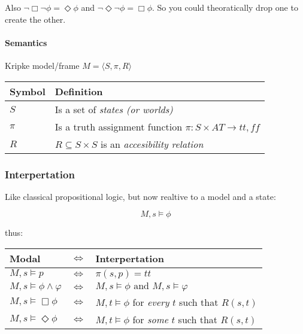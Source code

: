 \documentclass{article}
\begin{document}
\noindent
Also $\neg\Box\neg\phi = \Diamond\phi$ and
$\neg\Diamond\neg\phi = \Box\phi$. So you could theoratically
drop one to create the other.

\paragraph{Semantics} Kripke %
model/frame $M=\langle S,\pi,R \rangle$

\begin{tabular}{ll}
	Symbol & Definition \\ \toprule
	$S$ & Is a set of \emph{states (or worlds)} \\
	$\pi$ & Is a truth assignment function $\pi : S \times AT \to {tt, ff}$ \\
	$R$	& $R \subseteq S \times S$ is an \emph{accesibility relation}\\
\end{tabular}

\subsubsection{Interpertation}

\begin{center}
\end{center}

Like classical propositional logic, but now realtive to a model and a state:

\[ M,s \vDash \phi \]

thus:

\begin{tabular}{lll}
	Modal & $\Leftrightarrow$ & Interpertation \\ \toprule
$M,s \vDash p$ & $\Leftrightarrow$ & $\pi(s,p) = tt$ \\
$M,s \vDash \phi \wedge \varphi $ & $\Leftrightarrow$ & $ M,s \vDash \phi
\mbox{ and }M,s\vDash \varphi$ \\
$M,s \vDash \Box \phi $ & $\Leftrightarrow$ & $ M,t \vDash \phi $ for 
\emph{every} $t$ such that $R(s,t)$ \\
$M,s \vDash \Diamond \phi $ & $\Leftrightarrow$ & $ M,t \vDash \phi $ for 
\emph{some} $t$ such that $R(s,t)$ \\\bottomrule
\end{tabular}
\end{document}
